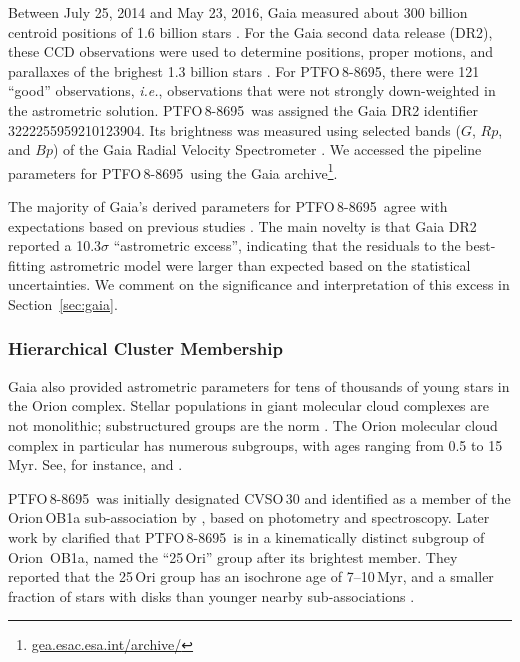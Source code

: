 \documentclass[12pt,twocolumn,tighten]{aastex62}
\newcommand{\ptfo}{PTFO$\,$8-8695}
\begin{document}
Between July 25, 2014 and May 23, 2016, Gaia measured about 300
billion centroid positions of 1{.}6 billion stars
\citep{gaia_collaboration_gaia_2016,lindegren_gaiasoln_2018,gaia_collaboration_gaia_2018}.
For the Gaia second data release (DR2), these CCD observations were
used to determine positions, proper motions, and parallaxes of the
brighest 1{.}3 billion stars \citep{lindegren_gaiasoln_2018}.  For
\ptfo, there were 121 ``good'' observations, {\it i.e.}, observations
that were not strongly down-weighted in the astrometric solution.
\ptfo\ was assigned the Gaia DR2 identifier 3222255959210123904.  Its
brightness was measured using selected bands ($G$, $Rp$, and $Bp$) of
the Gaia Radial Velocity Spectrometer
\citep{cropper_gaia_2018,evans_gaia_2018}.  We accessed the pipeline
parameters for \ptfo\ using the Gaia
archive\footnote{\url{gea.esac.esa.int/archive/}}.

The majority of Gaia's derived parameters for \ptfo\ agree with
expectations based on previous studies
\citep{briceno_cida_2005,van_eyken_ptf_2012}.  The main novelty is
that Gaia DR2 reported a 10.3$\sigma$ ``astrometric excess'',
indicating that the residuals to the best-fitting astrometric model
were larger than expected based on the statistical uncertainties.  We
comment on the significance and interpretation of this excess in
Section~\ref{sec:gaia}.


\subsubsection{Hierarchical Cluster Membership}
\label{subsec:hierarchical}

Gaia also provided astrometric parameters for tens of thousands of
young stars in the Orion complex.  Stellar populations in giant
molecular cloud complexes are not monolithic; substructured groups are
the norm \citep{briceno_lowmassOB_2007}.  The Orion molecular cloud
complex in particular has numerous subgroups, with ages ranging from
0.5 to 15$\,$Myr. See, for instance,
\citet{briceno_cida_2005,jeffries_kinematic_2006,briceno_25_2007,kounkel_apogee2_2018}
and \citet{briceno_cidaII_2019}.

\ptfo\ was initially designated CVSO\,30 and identified as a member of
the Orion$\,$OB1a sub-association by \citet{briceno_cida_2005}, based
on photometry and spectroscopy.  Later work by \citet{briceno_25_2007}
clarified that \ptfo\ is in a kinematically distinct subgroup of
Orion~OB1a, named the ``25$\,$Ori'' group after its brightest member.
They reported that the 25$\,$Ori group has an isochrone age of
7--10$\,$Myr, and a smaller fraction of stars with disks than younger
nearby sub-associations \citep{hernandez_spitzer_ob1_2007}.
\end{document}
